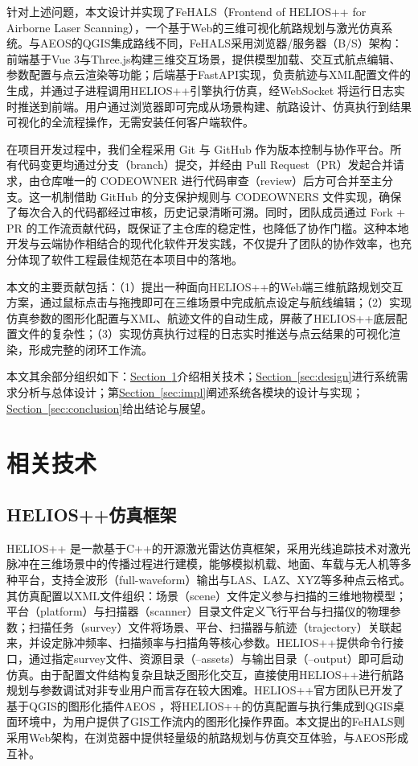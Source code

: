 \documentclass[a4paper,fleqn]{cas-sc}
\newcommand{\refSec}[1]{\hyperref[#1]{Section~\ref*{#1}}}
\begin{document}
针对上述问题，本文设计并实现了FeHALS（Frontend of HELIOS++ for Airborne Laser Scanning），一个基于Web的三维可视化航路规划与激光仿真系统。与AEOS的QGIS集成路线不同，FeHALS采用浏览器/服务器（B/S）架构：前端基于Vue 3与Three.js构建三维交互场景，提供模型加载、交互式航点编辑、参数配置与点云渲染等功能；后端基于FastAPI实现，负责航迹与XML配置文件的生成，并通过子进程调用HELIOS++引擎执行仿真，经WebSocket \citep{WebSocket} 将运行日志实时推送到前端。用户通过浏览器即可完成从场景构建、航路设计、仿真执行到结果可视化的全流程操作，无需安装任何客户端软件。

在项目开发过程中，我们全程采用 Git 与 GitHub 作为版本控制与协作平台。所有代码变更均通过分支（branch）提交，并经由 Pull Request（PR）发起合并请求，由仓库唯一的 CODEOWNER 进行代码审查（review）后方可合并至主分支。这一机制借助 GitHub 的分支保护规则与 CODEOWNERS 文件实现，确保了每次合入的代码都经过审核，历史记录清晰可溯。同时，团队成员通过 Fork + PR 的工作流贡献代码，既保证了主仓库的稳定性，也降低了协作门槛。这种本地开发与云端协作相结合的现代化软件开发实践，不仅提升了团队的协作效率，也充分体现了软件工程最佳规范在本项目中的落地。

本文的主要贡献包括：（1）提出一种面向HELIOS++的Web端三维航路规划交互方案，通过鼠标点击与拖拽即可在三维场景中完成航点设定与航线编辑；（2）实现仿真参数的图形化配置与XML、航迹文件的自动生成，屏蔽了HELIOS++底层配置文件的复杂性；（3）实现仿真执行过程的日志实时推送与点云结果的可视化渲染，形成完整的闭环工作流。

本文其余部分组织如下：\refSec{sec:tech}介绍相关技术；\refSec{sec:design}进行系统需求分析与总体设计；第\refSec{sec:impl}阐述系统各模块的设计与实现；\refSec{sec:conclusion}给出结论与展望。

\section{相关技术}\label{sec:tech}
\subsection{HELIOS++仿真框架}
HELIOS++ \citep{heliosPlusPlus}是一款基于C++的开源激光雷达仿真框架，采用光线追踪技术对激光脉冲在三维场景中的传播过程进行建模，能够模拟机载、地面、车载与无人机等多种平台，支持全波形（full-waveform）输出与LAS、LAZ、XYZ等多种点云格式。其仿真配置以XML文件组织：场景（scene）文件定义参与扫描的三维地物模型；平台（platform）与扫描器（scanner）目录文件定义飞行平台与扫描仪的物理参数；扫描任务（survey）文件将场景、平台、扫描器与航迹（trajectory）关联起来，并设定脉冲频率、扫描频率与扫描角等核心参数。HELIOS++提供命令行接口，通过指定survey文件、资源目录（--assets）与输出目录（--output）即可启动仿真。由于配置文件结构复杂且缺乏图形化交互，直接使用HELIOS++进行航路规划与参数调试对非专业用户而言存在较大困难。HELIOS++官方团队已开发了基于QGIS的图形化插件AEOS \citep{aeos}，将HELIOS++的仿真配置与执行集成到QGIS桌面环境中，为用户提供了GIS工作流内的图形化操作界面。本文提出的FeHALS则采用Web架构，在浏览器中提供轻量级的航路规划与仿真交互体验，与AEOS形成互补。
\end{document}

